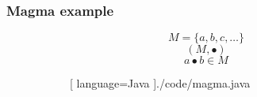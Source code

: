 \begin{frame}
  \frametitle{Magma example}
  \begin{figure}[H]
    \begin{subfigure}[h]{0.45\textwidth}
      \begin{equation}
        M = \{ a, b, c, \dots \}
      \end{equation}
      \begin{equation}
        (M, \bullet)
      \end{equation}
      \begin{equation}
        a \bullet b \in M
      \end{equation}
    \end{subfigure}
    \hfill
    \begin{subfigure}[h]{0.45\textwidth}
      \begin{center}
        \pause
      
      [ language=Java
      ]{./code/magma.java}
  \end{center}
    \end{subfigure}
  \end{figure}
\end{frame}

\hidelogo

